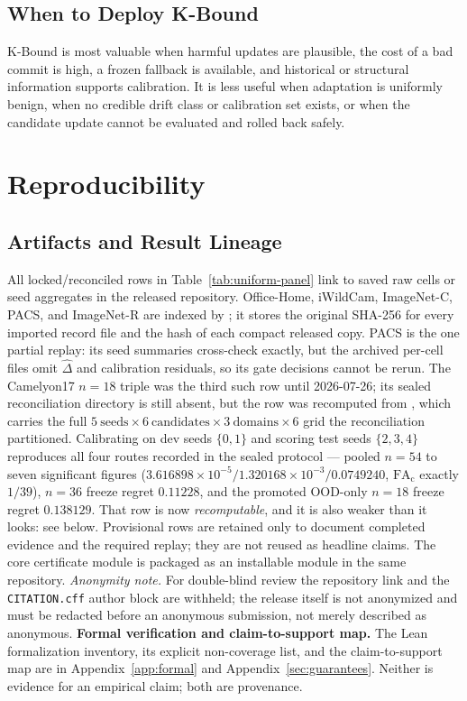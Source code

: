 \subsection{When to Deploy K-Bound}
K-Bound is most valuable when harmful updates are plausible, the cost of a bad commit is high, a frozen fallback is available, and historical or structural information supports calibration. It is less useful when adaptation is uniformly benign, when no credible drift class or calibration set exists, or when the candidate update cannot be evaluated and rolled back safely.


\section{Reproducibility}\label{sec:repro-main}
\subsection{Artifacts and Result Lineage}
All locked/reconciled rows in Table~\ref{tab:uniform-panel} link to
saved raw cells or seed aggregates in the released repository. Office-Home, iWildCam, ImageNet-C,
PACS, and ImageNet-R are indexed by
; it stores the original
SHA-256 for every imported record file and the hash of each compact released copy. PACS is the one
partial replay: its seed summaries cross-check exactly, but the archived per-cell files omit
$\widehat\Delta$ and calibration residuals, so its gate decisions cannot be rerun. The Camelyon17 $n{=}18$ triple
was the third such row until 2026-07-26; its sealed reconciliation directory is still absent, but the
row was recomputed from , which carries the full
$5\ \text{seeds}\times6\ \text{candidates}\times3\ \text{domains}\times6$ grid the reconciliation
partitioned. Calibrating on dev seeds $\{0,1\}$ and scoring test seeds $\{2,3,4\}$ reproduces all
four routes recorded in the sealed protocol --- pooled $n{=}54$ to seven significant figures
($3.616898{\times}10^{-5}/1.320168{\times}10^{-3}/0.0749240$, $\mathrm{FA}_{\mathrm c}$ exactly
$1/39$), $n{=}36$ freeze regret $0.11228$, and the promoted OOD-only $n{=}18$ freeze regret
$0.138129$. That row is now \emph{recomputable}, and it is also weaker than it looks: see below. Provisional rows are
retained only to document completed evidence and the required replay; they are not reused as headline
claims. The core certificate module is packaged as an installable module in the same repository.
\ifanon
\emph{Anonymity note.} For double-blind review the repository link and the \texttt{CITATION.cff}
author block are withheld; the release itself is not anonymized and must be redacted before an
anonymous submission, not merely described as anonymous.
\fi
\noindent\textbf{Formal verification and claim-to-support map.} The Lean formalization
inventory, its explicit non-coverage list, and the claim-to-support map are in
Appendix~\ref{app:formal} and Appendix~\ref{sec:guarantees}. Neither is evidence for an
empirical claim; both are provenance.

